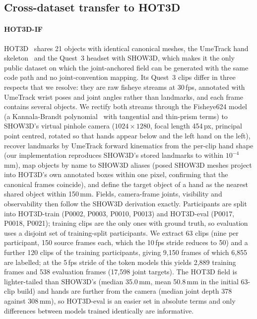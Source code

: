 \subsection{Cross-dataset transfer to HOT3D}
\label{sec:cross}

\paragraph{HOT3D-IF}
HOT3D~\cite{banerjee2025hot3d} shares 21 objects with identical canonical meshes, the UmeTrack hand skeleton~\cite{han2022umetrack} and the Quest~3 headset with SHOW3D, which makes it the only public dataset on which the joint-anchored field can be generated with the same code path and no joint-convention mapping. Its Quest~3 clips differ in three respects that we resolve: they are raw fisheye streams at 30\,fps, annotated with UmeTrack wrist poses and joint angles rather than landmarks, and each frame contains several objects. We rectify both streams through the Fisheye624 model (a Kannala-Brandt polynomial~\cite{kannala2006generic} with tangential and thin-prism terms) to SHOW3D's virtual pinhole camera ($1024\times1280$, focal length 454\,px, principal point centred, rotated so that hands appear below and the left hand on the left), recover landmarks by UmeTrack forward kinematics from the per-clip hand shape (our implementation reproduces SHOW3D's stored landmarks to within $10^{-4}$\,mm), map objects by name to SHOW3D aliases (posed SHOW3D meshes project into HOT3D's own annotated boxes within one pixel, confirming that the canonical frames coincide), and define the target object of a hand as the nearest shared object within 150\,mm. Fields, camera-frame joints, visibility and observability then follow the SHOW3D derivation exactly. Participants are split into HOT3D-train (P0002, P0003, P0010, P0013) and HOT3D-eval (P0017, P0018, P0021); training clips are the only ones with ground truth, so evaluation uses a disjoint set of training-split participants. We extract 63 clips (nine per participant, 150 source frames each, which the 10\,fps stride reduces to 50) and a further 120 clips of the training participants, giving 9,150 frames of which 6,855 are labelled; at the 5\,fps stride of the token models this yields 2,889 training frames and 538 evaluation frames (17,598 joint targets). The HOT3D field is lighter-tailed than SHOW3D's (median 35.0\,mm, mean 50.8\,mm in the initial 63-clip build) and hands are further from the camera (median joint depth 378 against 308\,mm), so HOT3D-eval is an easier set in absolute terms and only differences between models trained identically are informative.

